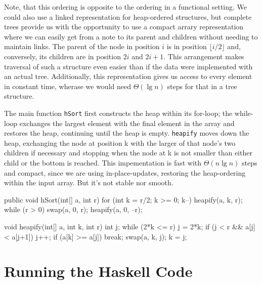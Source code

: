 Note, that this ordering is opposite to the ordering in a functional setting.
We could also use a linked representation for heap-ordered structures, but complete trees provide us with the opportunity to use a compact arrary representation where we can easily get from a note to its parent and children without needing to maintain links.
The parent of the node in position $i$ is in position $\lfloor i/2 \rfloor$ and, conversely, its children are in position $2i$ and $2i+1$.
This arrangement makes traversal of such a structure even easier than if the data were implemented with an actual tree.
Additionally, this representation gives us access to every element in constant time, wherase we would need $\Theta(\lg n)$ steps for that in a tree structure.

\begin{impl}
The main function \texttt{hSort} first constructs the heap within its for-loop; the while-loop exchanges the largest element with the final element in the array and restores the heap, continuing until the heap is empty.
\texttt{heapify} moves down the heap, exchanging the node at position k with the larger of that node's two children if necessary and stopping when the node at k is not smaller than either child or the bottom is reached.
This impementation is fast with $\Theta(n \lg n)$ steps and compact, since we are using in-place-updates, restoring the heap-ordering within the input array. But it's not stable nor smooth.
\end{impl}

\begin{javacode}
public void hSort(int[] a, int r) {
    for (int k = r/2; k >= 0; k--)
        heapify(a, k, r);
    while (r > 0) {
        swap(a, 0, r);
        heapify(a, 0, --r);
    }
}

void heapify(int[] a, int k, int r) {
    int j;
    while (2*k <= r) {
        j = 2*k;
        if (j < r && a[j] < a[j+1]) j++;
        if (a[k] >= a[j]) break;
        swap(a, k, j);
        k = j;
    }
}
\end{javacode}

\section{Running the Haskell Code}

